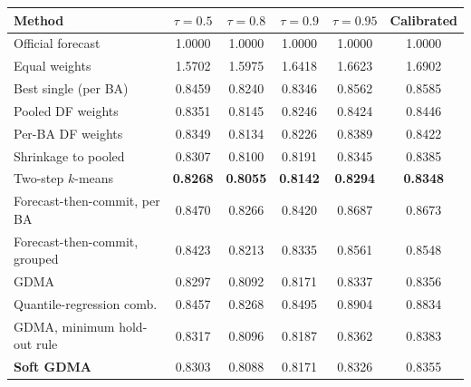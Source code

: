 \begin{tabular}{@{}lccccc@{}}
\toprule
Method & $\tau=0.5$ & $\tau=0.8$ & $\tau=0.9$ & $\tau=0.95$ & Calibrated \\
\midrule
Official forecast & 1.0000 & 1.0000 & 1.0000 & 1.0000 & 1.0000 \\
Equal weights & 1.5702 & 1.5975 & 1.6418 & 1.6623 & 1.6902 \\
Best single (per BA) & 0.8459 & 0.8240 & 0.8346 & 0.8562 & 0.8585 \\
Pooled DF weights & 0.8351 & 0.8145 & 0.8246 & 0.8424 & 0.8446 \\
Per-BA DF weights & 0.8349 & 0.8134 & 0.8226 & 0.8389 & 0.8422 \\
Shrinkage to pooled & 0.8307 & 0.8100 & 0.8191 & 0.8345 & 0.8385 \\
Two-step $k$-means & \textbf{0.8268} & \textbf{0.8055} & \textbf{0.8142} & \textbf{0.8294} & \textbf{0.8348} \\
Forecast-then-commit, per BA & 0.8470 & 0.8266 & 0.8420 & 0.8687 & 0.8673 \\
Forecast-then-commit, grouped & 0.8423 & 0.8213 & 0.8335 & 0.8561 & 0.8548 \\
GDMA & 0.8297 & 0.8092 & 0.8171 & 0.8337 & 0.8356 \\
Quantile-regression comb. & 0.8457 & 0.8268 & 0.8495 & 0.8904 & 0.8834 \\
GDMA, minimum hold-out rule & 0.8317 & 0.8096 & 0.8187 & 0.8362 & 0.8383 \\
\textbf{Soft GDMA} & 0.8303 & 0.8088 & 0.8171 & 0.8326 & 0.8355 \\
\bottomrule
\end{tabular}